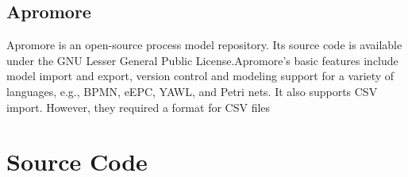 \subsection{Apromore}
Apromore is an open-source process model repository. Its source code is available under the GNU Lesser General Public License.Apromore’s basic features include model import and export, version control and modeling support for a variety of languages, e.g., BPMN,
eEPC, YAWL, and Petri nets. It also supports CSV import. However, they required a format for CSV files 

\section{Source Code}

